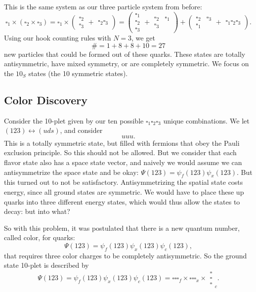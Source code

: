 \documentclass[fontsize=12pt]{scrartcl}
\begin{document}
This is the same system as our three particle system from before: $$\square_1\times(\square_2\times\square_3)=\square_1\times\left(\begin{matrix}
\square_2\\\square_3
\end{matrix}+\begin{matrix}
\square_2\square_3
\end{matrix}\right) = \left(\begin{matrix}
\square_1\\\square_2\\\square_3
\end{matrix}+\begin{matrix}
\square_2& \square_1 \\\square_3 & 
\end{matrix}\right) + \left(\begin{matrix}
\square_2 & \square_3\\\square_1 &
\end{matrix}+\begin{matrix}
\square_1\square_2\square_3
\end{matrix}\right).$$ Using our hook counting rules with $N=3$, we get $$\# = 1+8+8+10=27$$ new particles that could be formed out of these quarks. These states are totally antisymmetric, have mixed symmetry, or are completely symmetric. We focus on the $10_S$ states (the 10 symmetric states).

\subsection{Color Discovery}

Consider the 10-plet given by our ten possible $\square_1\square_2\square_3$ unique combinations. We let $(123)\leftrightarrow(uds)$, and consider $$\boxed{u}\boxed{u}\boxed{u}.$$ This is a totally symmetric state, but filled with fermions that obey the Pauli exclusion principle. So this should not be allowed. But we consider that each flavor state also has a space state vector, and naively we would assume we can antisymmetrize the space state and be okay: $\Psi(123)=\psi_f(123)\psi_x(123).$ But this turned out to not be satisfactory. Antisymmetrizing the spatial state costs energy, since all ground states are symmetric. We would have to place these up quarks into three different energy states, which would thus allow the states to decay: but into what?

So with this problem, it was postulated that there is a new quantum number, called color, for quarks: $$\Psi(123)=\psi_f(123)\psi_x(123)\psi_c(123),$$ that requires three color charges to be completely antisymmetric. So the ground state 10-plet is described by $$\Psi(123)=\psi_f(123)\psi_x(123)\psi_c(123) = \square\square\square_f\times\square\square\square_x\times\begin{matrix}
\square\\\square\\\square
\end{matrix}_c.$$
\end{document}
